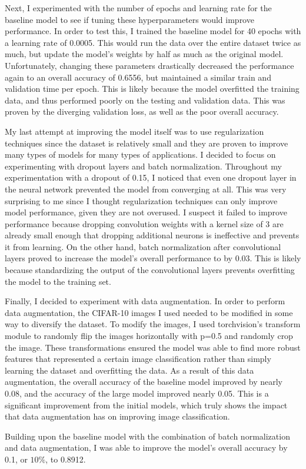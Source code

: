 \documentclass[11pt,a4paper]{article}
\begin{document}
Next, I experimented with the number of epochs and learning rate for the baseline model to see if tuning these hyperparameters 
 would improve performance. In order to test this, I trained the baseline model for 40 epochs with a learning rate of 0.0005.
  This would run the data over the entire dataset twice as much, but update the model's weights by half as much as the original 
  model. Unfortunately, changing these parameters drastically decreased the performance again to an overall accuracy of 0.6556, 
  but maintained a similar train and validation time per epoch. This is likely because the model overfitted the training data, 
  and thus performed poorly on the testing and validation data. This was proven by the diverging validation loss, as well as the 
  poor overall accuracy.

My last attempt at improving the model itself was to use regularization techniques since the dataset is relatively small and
 they are proven to improve many types of models for many types of applications. I decided to focus on experimenting with dropout 
 layers and batch normalization. Throughout my experimentation with a dropout of 0.15, I noticed that even one dropout layer in 
 the neural network prevented the model from converging \italics at all. This was very surprising to me since I thought regularization 
 techniques can only improve model performance, given they are not overused. I suspect it failed to improve performance because dropping 
 convolution weights with a kernel size of 3 are already small enough that dropping additional neurons is ineffective and prevents it
  from learning. On the other hand, batch normalization after convolutional layers proved to increase the model's overall performance
  to by 0.03. This is likely because standardizing the output of the convolutional layers prevents overfitting the model to the training set.

Finally, I decided to experiment with data augmentation. In order to perform data augmentation, the CIFAR-10 images I used needed
 to be modified in some way to diversify the dataset. To modify the images, I used torchvision's transform module to randomly flip 
 the images horizontally with p=0.5 and randomly crop the image. These transformations ensured the model was able to find more robust 
 features that represented a certain image classification rather than simply learning the dataset and overfitting the data. As a 
 result of this data augmentation, the overall accuracy of the baseline model improved by nearly 0.08, and the accuracy of the large 
 model improved nearly 0.05. This is a significant improvement from the initial models, which truly shows the impact that data 
 augmentation has on improving image classification.

Building upon the baseline model with the combination of batch normalization and data augmentation, I was able to improve the
 model's overall accuracy by 0.1, or $10\%$, to 0.8912.


\printbibliography
\end{document}
